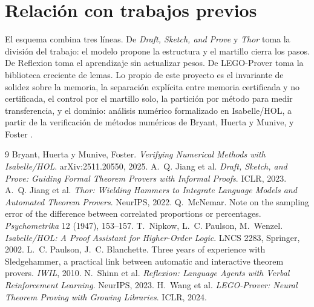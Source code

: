 \documentclass[11pt]{article}
\theoremstyle{remark}
\newcommand{\1}{\mathbb{1}}
\begin{document}
\section{Relación con trabajos previos}

El esquema combina tres líneas. De \emph{Draft, Sketch, and Prove} \cite{jiang2023dsp} y \emph{Thor} \cite{jiang2022thor} toma la división del trabajo: el modelo propone la estructura y el martillo cierra los pasos. De Reflexion \cite{shinn2023} toma el aprendizaje sin actualizar pesos. De LEGO-Prover \cite{wang2024lego} toma la biblioteca creciente de lemas. Lo propio de este proyecto es el invariante de solidez sobre la memoria, la separación explícita entre memoria certificada y no certificada, el control por el martillo solo, la partición por método para medir transferencia, y el dominio: análisis numérico formalizado en Isabelle/HOL, a partir de la verificación de métodos numéricos de Bryant, Huerta y Munive, y Foster \cite{bryant2025}.

\begin{thebibliography}{9}\small
{} Bryant, Huerta y Munive, Foster. \emph{Verifying Numerical Methods with Isabelle/HOL}. arXiv:2511.20550, 2025.
 A.~Q. Jiang et al. \emph{Draft, Sketch, and Prove: Guiding Formal Theorem Provers with Informal Proofs}. ICLR, 2023.
 A.~Q. Jiang et al. \emph{Thor: Wielding Hammers to Integrate Language Models and Automated Theorem Provers}. NeurIPS, 2022.
 Q.~McNemar. Note on the sampling error of the difference between correlated proportions or percentages. \emph{Psychometrika} 12 (1947), 153--157.
 T.~Nipkow, L.~C. Paulson, M.~Wenzel. \emph{Isabelle/HOL: A Proof Assistant for Higher-Order Logic}. LNCS 2283, Springer, 2002.
 L.~C. Paulson, J.~C. Blanchette. Three years of experience with Sledgehammer, a practical link between automatic and interactive theorem provers. \emph{IWIL}, 2010.
 N.~Shinn et al. \emph{Reflexion: Language Agents with Verbal Reinforcement Learning}. NeurIPS, 2023.
 H.~Wang et al. \emph{LEGO-Prover: Neural Theorem Proving with Growing Libraries}. ICLR, 2024.
\end{thebibliography}
\end{document}
